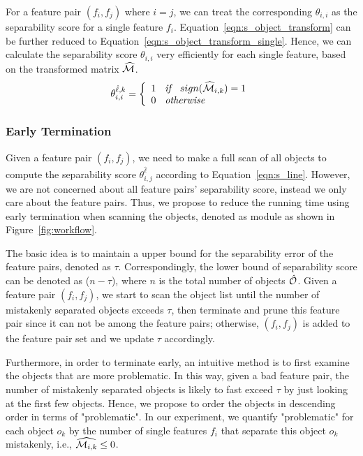  For a feature pair $(f_i,f_j)$ where $i=j$, we can treat the corresponding $\theta_{i,i}$ as the separability score for a single feature $f_i$. Equation~\ref{eqn:s_object_transform} can be further reduced to Equation~\ref{eqn:s_object_transform_single}. Hence, we can calculate the separability score $\theta_{i,i}$ very efficiently for each single feature, based on the transformed matrix $\widehat{\mm}$.
\begin{equation}\label{eqn:s_object_transform_single}
\theta_{i,i}^{\hat{\ell},k}=\left\{
                \begin{array}{ll}
                  1 \textit{\hspace{2mm} if \hspace{2mm}} sign(\widehat{\mm}_{i,k}) = 1\\
                  0 \textit{\hspace{2mm} otherwise \hspace{2mm}} 
                \end{array}
              \right.
\end{equation}


\subsubsection{Early Termination} \label{ssec:earlyT}
Given a feature pair $(f_i,f_j)$, we need to make a full scan of all objects to compute the separability score $\theta_{i,j}^{\hat{\ell}}$ according to Equation~\ref{eqn:s_line}. However, we are not concerned about all feature pairs' separability score, instead we only care about the \topk feature pairs. Thus, we propose to reduce the running time using early termination when scanning the objects, denoted as \earlyT module as shown in Figure~\ref{fig:workflow}.

 The basic idea is to maintain a upper bound for the separability error of the \topk feature pairs, denoted as $\tau$. Correspondingly, the lower bound of separability score can be denoted as ($n-\tau$), where $n$ is the total number of objects $\hat{\oo}$. Given a feature pair $(f_i,f_j)$, we start to scan the object list until the number of mistakenly separated objects exceeds $\tau$, then terminate and prune this feature pair since it can not be among the \topk feature pairs; otherwise, $(f_i,f_j)$ is added to the \topk feature pair set and we update $\tau$ accordingly.

 Furthermore, in order to terminate early, an intuitive method is to first examine the objects that are more problematic. In this way, given a bad feature pair, the number of mistakenly separated objects is likely to fast exceed $\tau$ by just looking at the first few objects. Hence, we propose to order the objects in descending order in terms of "problematic". In our experiment, we quantify "problematic" for each object $o_k$ by the number of single features $f_i$ that separate this object $o_k$ mistakenly, i.e., $\widehat{\mm_{i,k}}\leq0$.

